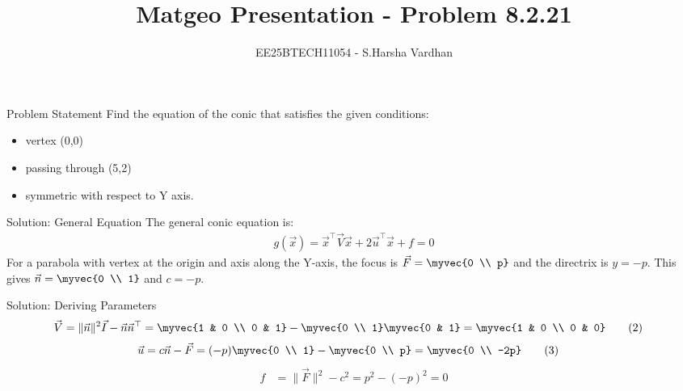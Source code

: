 \documentclass{beamer}
\title{Matgeo Presentation - Problem 8.2.21}
\author{EE25BTECH11054 - S.Harsha Vardhan}
\numberwithin{equation}{section}
\theoremstyle{remark}
\begin{document}
\begin{frame}
  \titlepage
\end{frame}

\begin{frame}{Problem Statement}
Find the equation of the conic that satisfies the given conditions:
\begin{itemize}
    \item vertex (0,0)
    \item passing through (5,2)
    \item symmetric with respect to Y axis.
\end{itemize}
\end{frame}

\begin{frame}{Solution: General Equation}
The general conic equation is:
\begin{align}
 g(\vec{x}) = \vec{x}^\top \vec{V}\vec{x} + 2\vec{u}^\top \vec{x} + f = 0 \tag{1}
\end{align}
For a parabola with vertex at the origin and axis along the Y-axis, the focus is $\vec{F} = \myvec{0 \\ p}$ and the directrix is $y = -p$. This gives $\vec{n} = \myvec{0 \\ 1}$ and $c = -p$.
\end{frame}

\begin{frame}{Solution: Deriving Parameters}
\begin{align}
	\vec{V} &= \|\vec{n}\|^2 \vec{I} - \vec{n}\vec{n}^\top 
	= \myvec{1 & 0 \\ 0 & 1} - \myvec{0 \\ 1}\myvec{0 & 1} 
	= \myvec{1 & 0 \\ 0 & 0} \tag{2}
\end{align}
\begin{align}
	\vec{u} &= c\vec{n} - \vec{F} 
	= (-p)\myvec{0 \\ 1} - \myvec{0 \\ p} 
	= \myvec{0 \\ -2p} \tag{3}
\end{align}
\begin{align}
	f &= \|\vec{F}\|^2 - c^2 = p^2 - (-p)^2 = 0 \tag{4}
\end{align}
\end{frame}
\end{document}
